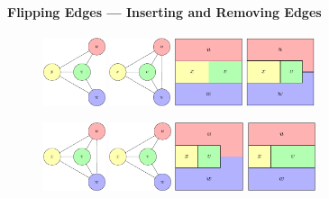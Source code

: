 \documentclass[t,18pt]{beamer}
\newcommand{\emdash}{---}
\begin{document}
\begin{frame}[c]
  \frametitle{}
  \framesubtitle{Flipping Edges \emdash{} Inserting and Removing Edges}
  \begin{figure}
    \includegraphics[height=2cm]{../Thesis/Resources/FlipEdge-Example-Insert-1.pdf}
    \quad
    \includegraphics[height=2cm]{../Thesis/Resources/FlipEdge-Example-Insert-2.pdf}
    \quad
    \includegraphics[height=2cm]{../Thesis/Resources/FlipEdge-Example-Insert-3.pdf}
    \quad
    \includegraphics[height=2cm]{../Thesis/Resources/FlipEdge-Example-Insert-4.pdf}
  \end{figure}
  \begin{figure}
    \includegraphics[height=2cm]{../Thesis/Resources/FlipEdge-Example-Remove-1.pdf}
    \quad
    \includegraphics[height=2cm]{../Thesis/Resources/FlipEdge-Example-Remove-2.pdf}
    \quad
    \includegraphics[height=2cm]{../Thesis/Resources/FlipEdge-Example-Remove-3.pdf}
    \quad
    \includegraphics[height=2cm]{../Thesis/Resources/FlipEdge-Example-Remove-4.pdf}
  \end{figure}
\end{frame}
\end{document}
